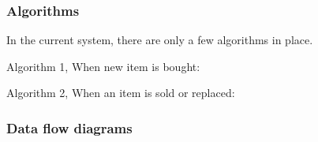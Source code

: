 \subsubsection{Algorithms}

In the current system, there are only a few algorithms in place.
\bigskip

\begin{algorithm}[H]
    \caption{Algorithm 1, When new item is bought:}
\begin{algorithmic}[1]
\EndIf
\end{algorithmic}
\end{algorithm}

\begin{algorithm}[H]
    \caption{Algorithm 2, When an item is sold or replaced:}
\begin{algorithmic}[1]
\EndIf
\end{algorithmic}
\end{algorithm}

\subsubsection{Data flow diagrams}

